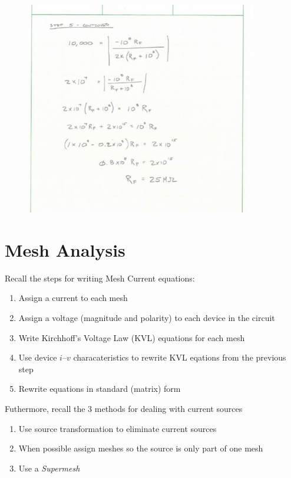 \documentclass{handout}
\begin{document}
{\newpage
\clearpage
\pagebreak

\begin{figure}[h! t! b!]
\centering
\includegraphics[width=0.9\textwidth]{Example4solnC.jpg}
\end{figure}

}

\newpage
\clearpage
\pagebreak

\section{Mesh Analysis}
Recall the steps for writing Mesh Current equations:
\begin{enumerate}
\item Assign a current to each mesh
\item Assign a voltage (magnitude and polarity) to each device in the circuit
\item Write Kirchhoff's Voltage Law (KVL) equations for each mesh
\item Use device $i$--$v$ characateristics to rewrite KVL eqations from the previous step
\item Rewrite equations in standard (matrix) form
\end{enumerate}

Futhermore, recall the 3 methods for dealing with current sources
\begin{enumerate}
\item Use source transformation to eliminate current sources
\item When possible assign meshes so the source is only part of one mesh
\item Use a {\em Supermesh}
\end{enumerate}
\end{document}
